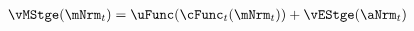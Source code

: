   \begin{equation}\begin{gathered}\begin{aligned}
\vMStge(\mNrm_{t}) & = \uFunc(\cFunc_{t}(\mNrm_{t})) + \vEStge(\aNrm_{t}) \label{eq:vMStge}
      \end{aligned}\end{gathered}\end{equation}
